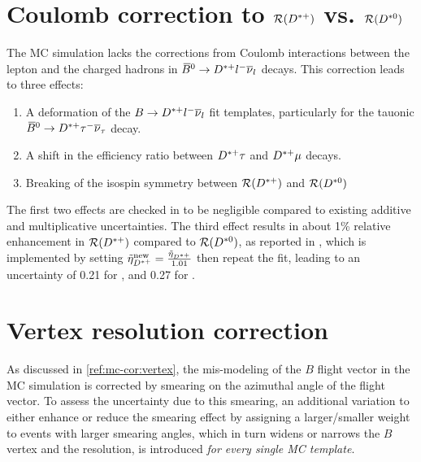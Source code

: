 \section{Coulomb correction to $\mathcal{R}({{D}^{*+}})$ vs. $\mathcal{R}({{D}^{*0}})$}
\label{sys-theory-coulomb}

The MC simulation lacks the corrections from Coulomb interactions between
the lepton and the charged hadrons in
${{\kern 0.18em\overline{\kern -0.18em B}}{}^0} \rightarrow {\ensuremath{{D}^{*+}}}{\ensuremath{l^-}}{\ensuremath{{\overline{\nu}}_l}}$ decays.
This correction leads to three effects:

\begin{enumerate}
    \item A deformation of the
        $B \rightarrow {\ensuremath{{D}^{*+}}}{\ensuremath{l^-}}{\ensuremath{{\overline{\nu}}_l}}$ fit templates,
        particularly for the tauonic
        ${{\kern 0.18em\overline{\kern -0.18em B}}{}^0} \rightarrow {\ensuremath{{D}^{*+}}}{\ensuremath{\tau^-}}{\ensuremath{{\overline{\nu}}_\tau}}$ decay.
    \item A shift in the efficiency ratio between ${{D}^{*+}}\tau$ and ${{D}^{*+}}\mu$
        decays.
    \item Breaking of the isospin symmetry between
        $\mathcal{R}({{D}^{*+}})$ and $\mathcal{R}({{D}^{*0}})$
\end{enumerate}

The first two effects are checked in \cite{LHCb-ANA-2020-056} to be negligible
compared to existing additive and multiplicative uncertainties.
The third effect results in about 1\% relative enhancement in $\mathcal{R}
({{D}^{*+}})$ compared to $\mathcal{R}({{D}^{*0}})$,
as reported in \cite{Cal__2019},
which is implemented by setting
$\tilde{\eta}_{{{D}^{*+}}}^\text{new} = \frac{\tilde{\eta}_{{{D}^{*+}}}}{1.01}$
then repeat the fit,
leading to an uncertainty of 0.21 for \RD,
and 0.27 for \RDst.



\section{Vertex resolution correction}
\label{sys-cor-vtx}

As discussed in \cref{ref:mc-cor:vertex},
the mis-modeling of the $B$ flight vector in the MC simulation is corrected by
smearing on the azimuthal angle of the flight vector.
To assess the uncertainty due to this smearing,
an additional variation to either enhance or reduce the smearing effect
by assigning a larger/smaller weight to events with larger smearing angles,
which in turn widens or narrows the $B$ vertex and the \mmSq resolution,
is introduced \emph{for every single MC template}.

